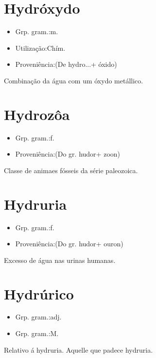\documentclass{article}
\begin{document}
\section{Hydróxydo}
\begin{itemize}
\item {Grp. gram.:m.}
\end{itemize}
\begin{itemize}
\item {Utilização:Chím.}
\end{itemize}
\begin{itemize}
\item {Proveniência:(De \textunderscore hydro...\textunderscore  + \textunderscore óxido\textunderscore )}
\end{itemize}
Combinação da água com um óxydo metállico.
\section{Hydrozôa}
\begin{itemize}
\item {Grp. gram.:f.}
\end{itemize}
\begin{itemize}
\item {Proveniência:(Do gr. \textunderscore hudor\textunderscore  + \textunderscore zoon\textunderscore )}
\end{itemize}
Classe de animaes fósseis da série paleozoica.
\section{Hydruria}
\begin{itemize}
\item {Grp. gram.:f.}
\end{itemize}
\begin{itemize}
\item {Proveniência:(Do gr. \textunderscore hudor\textunderscore  + \textunderscore ouron\textunderscore )}
\end{itemize}
Excesso de água nas urinas humanas.
\section{Hydrúrico}
\begin{itemize}
\item {Grp. gram.:adj.}
\end{itemize}
\begin{itemize}
\item {Grp. gram.:M.}
\end{itemize}
Relativo á hydruria.
Aquelle que padece hydruria.
\end{document}
